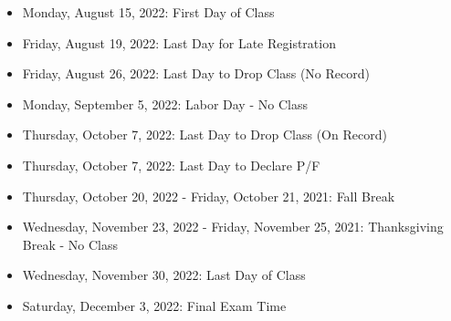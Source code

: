 \documentclass[11pt]{article}
\begin{document}
\begin{itemize}
    \item Monday, August 15, 2022: First Day of Class
    \item Friday, August 19, 2022: Last Day for Late Registration
    \item Friday, August 26, 2022: Last Day to Drop Class (No Record)
    \item Monday, September 5, 2022: Labor Day - No Class
    \item Thursday, October 7, 2022: Last Day to Drop Class (On Record)
    \item Thursday, October 7, 2022: Last Day to Declare P/F
    \item Thursday, October 20, 2022 - Friday, October 21, 2021: Fall Break
    \item Wednesday, November 23, 2022 - Friday, November 25, 2021: Thanksgiving Break - No Class
    \item Wednesday, November 30, 2022: Last Day of Class
    \item Saturday, December 3, 2022: Final Exam Time
\end{itemize}

\end{document}
